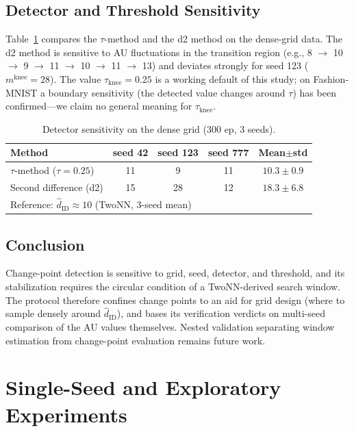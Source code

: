 \documentclass[make,article,submit,pdftex,moreauthors]{Definitions/mdpi}
\newcommand{\hatdID}{\hat{d}_{\mathrm{ID}}}
\newcommand{\mknee}{m^{\mathrm{knee}}}
\begin{document}
\subsection[\appendixname~\thesubsection]{Detector and Threshold Sensitivity}

Table~\ref{tab:knee_method} compares the $\tau$-method and the d2 method on
the dense-grid data.
The d2 method is sensitive to AU fluctuations in the transition region
(e.g., 8 $\to$ 10 $\to$ 9 $\to$ 11 $\to$ 10 $\to$ 11 $\to$ 13) and deviates
strongly for seed 123 ($\mknee = 28$).
The value $\tau_{\mathrm{knee}} = 0.25$ is a working default of this study;
on Fashion-MNIST a boundary sensitivity (the detected value changes around
$\tau$) has been confirmed---we claim no general meaning for
$\tau_{\mathrm{knee}}$.

\begin{table}[H]
\caption{Detector sensitivity on the dense grid (300 ep, 3 seeds).}
\label{tab:knee_method}
\small
\begin{tabular}{lcccc}
\toprule
\textbf{Method} & \textbf{seed 42} & \textbf{seed 123} & \textbf{seed 777} & \textbf{Mean$\pm$std} \\
\midrule
$\tau$-method ($\tau = 0.25$) & 11 & 9 & 11 & $10.3 \pm 0.9$ \\
Second difference (d2) & 15 & 28 & 12 & $18.3 \pm 6.8$ \\
\midrule
\multicolumn{5}{l}{Reference: $\hatdID \approx 10$ (TwoNN, 3-seed mean)} \\
\bottomrule
\end{tabular}
\end{table}

\subsection[\appendixname~\thesubsection]{Conclusion}

Change-point detection is sensitive to grid, seed, detector, and threshold,
and its stabilization requires the circular condition of a TwoNN-derived
search window.
The protocol therefore confines change points to an aid for grid design
(where to sample densely around $\hatdID$), and bases its verification
verdicts on multi-seed comparison of the AU values themselves.
Nested validation separating window estimation from change-point evaluation
remains future work.

\section[\appendixname~\thesection]{Single-Seed and Exploratory Experiments}\label{app:exploratory}
\end{document}
